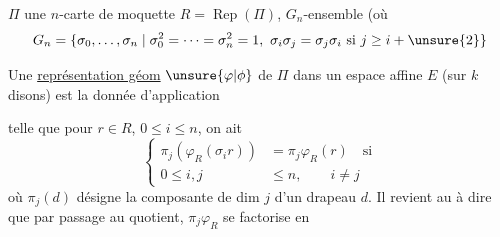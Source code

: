 $\Pi$ une $n$-carte  de moquette $R=\operatorname{Rep}(\Pi)$, $G_n$-ensemble (où
\[
G_n=\{\sigma_0,\ldots,\sigma_n\mid\sigma_0^2=\cdots=\sigma_n^2=1,\ \sigma_i\sigma_j=\sigma_j\sigma_i\text{ si }j\geq i+\unsure{2}\}
\]

Une \uline{représentation géom} $\unsure{\varphi|\phi}$ de $\Pi$ dans  un espace affine $E$ (sur  $k$ disons) est la donnée d'application

telle que pour $r\in R$, $0\leq i\leq n$, on ait
\[
\left\{\begin{aligned}
\pi_j(\varphi_R(\sigma_i r))&=\pi_j\varphi_R(r)\quad\text{si}\\
0\leq i,j&\leq n,\qquad i\ne j
\end{aligned}\right.
\tag*{(2)}
\]
où $\pi_j(d)$ désigne la composante de dim $j$ d'un drapeau $d$. Il revient au   à dire que par passage au quotient, $\pi_j\varphi_R$ se factorise en
